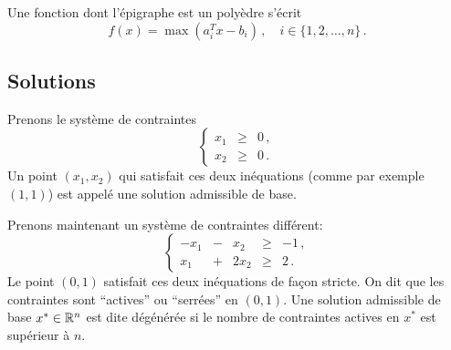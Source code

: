 	Une fonction dont l'épigraphe est un polyèdre s'écrit
	\[
	f(x) = \max \left( a_i^T x - b_i \right)\,,
	\quad i \in \{1,2,\dots,n\}\,.
	\]

\subsection{Solutions}

	Prenons le système de contraintes
	\[
	\renewcommand{\arraystretch}{1.5}
	\left\{
	\begin{array}{rcl}
		x_1 & \ge & 0\,,\\
		x_2 & \ge & 0\,.
	\end{array}
	\right.
	\]
	Un point $(x_1,x_2)$ qui satisfait ces deux inéquations
	(comme par exemple $(1,1)$)
	est appelé une solution admissible de base.

	Prenons maintenant un système de contraintes différent:
	\[
	\renewcommand{\arraystretch}{1.5}
	\left\{
	\begin{array}{rcrcr}
		-x_1 & - & x_2  & \ge & -1\,,\\
		 x_1 & + & 2x_2 & \ge &  2\,.
	\end{array}
	\right.
	\]
	Le point $(0,1)$ satisfait ces deux inéquations
	de façon stricte.
	On dit que les contraintes sont ``actives'' ou ``serrées'' en $(0,1)$.
	Une solution admissible de base $x^* \in \mathbb{R}^n$ est dite dégénérée
	si le nombre de contraintes actives
	en $x^*$ est supérieur à $n$.

	\begin{center}
	\end{center}

